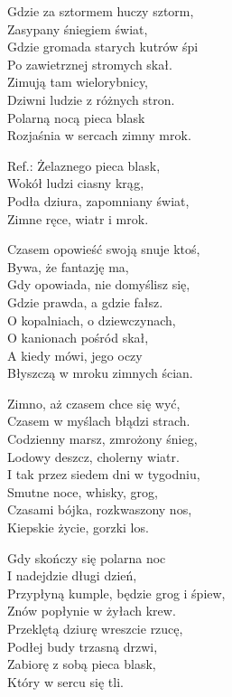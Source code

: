 \begin{text}
    Gdzie za sztormem huczy sztorm,\\
    Zasypany śniegiem świat,\\
    Gdzie gromada starych kutrów śpi\\
    Po zawietrznej stromych skał.\\
    Zimują tam wielorybnicy,\\
    Dziwni ludzie z różnych stron.\\
    Polarną nocą pieca blask\\
    Rozjaśnia w sercach zimny mrok.

    Ref.: Żelaznego pieca blask,\\
    Wokół ludzi ciasny krąg,\\
    Podła dziura, zapomniany świat,\\
    Zimne ręce, wiatr i mrok.

    Czasem opowieść swoją snuje ktoś,\\
    Bywa, że fantazję ma,\\
    Gdy opowiada, nie domyślisz się,\\
    Gdzie prawda, a gdzie fałsz.\\
    O kopalniach, o dziewczynach,\\
    O kanionach pośród skał,\\
    A kiedy mówi, jego oczy\\
    Błyszczą w mroku zimnych ścian.

    Zimno, aż czasem chce się wyć,\\
    Czasem w myślach błądzi strach.\\
    Codzienny marsz, zmrożony śnieg,\\
    Lodowy deszcz, cholerny wiatr.\\
    I tak przez siedem dni w tygodniu,\\
    Smutne noce, whisky, grog,\\
    Czasami bójka, rozkwaszony nos,\\
    Kiepskie życie, gorzki los.

    Gdy skończy się polarna noc\\
    I nadejdzie długi dzień,\\
    Przypłyną kumple, będzie grog i śpiew,\\
    Znów popłynie w żyłach krew.\\
    Przeklętą dziurę wreszcie rzucę,\\
    Podłej budy trzasną drzwi,\\
    Zabiorę z sobą pieca blask,\\
    Który w sercu się tli.
\end{text}
\begin{chord}

\end{chord}